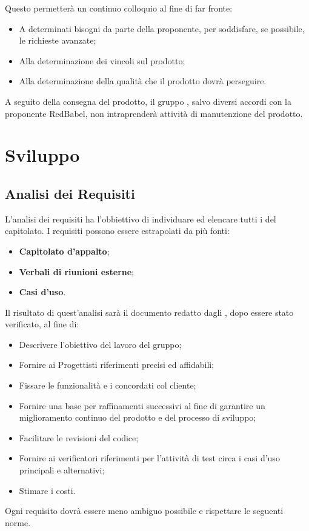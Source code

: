 \documentclass[NormeDiProgetto.tex]{subfiles}
\begin{document}
Questo permetterà un continuo colloquio al fine di far fronte:
\begin{itemize} 
	\item A determinati bisogni da parte della proponente, per soddisfare, se possibile, le richieste avanzate;
	\item Alla determinazione dei vincoli sul prodotto;
	\item Alla determinazione della qualità che il prodotto dovrà perseguire.
\end{itemize}
A seguito della consegna del prodotto, il gruppo \gruppo, salvo diversi accordi con la proponente RedBabel, non intraprenderà attività di manutenzione del prodotto. 

\section{Sviluppo}
\subsection{Analisi dei Requisiti}
L'analisi dei requisiti ha l'obbiettivo di individuare ed elencare tutti i  del capitolato. I requisiti possono essere estrapolati da più fonti:
\begin{itemize}
	\item \textbf{Capitolato d'appalto};
	\item \textbf{Verbali di riunioni esterne};
	\item \textbf{Casi d'uso}.
\end{itemize}
Il risultato di quest'analisi sarà il documento \adr \vrquattro redatto dagli \alisti, dopo essere stato verificato, al fine di:
\begin{itemize}
\item Descrivere l'obiettivo del lavoro del gruppo;
\item Fornire ai Progettisti riferimenti precisi ed affidabili;
\item Fissare le funzionalità e i  concordati col cliente;
\item Fornire una base per raffinamenti successivi al fine di garantire un
miglioramento continuo del prodotto e del processo di sviluppo;
\item Facilitare le revisioni del codice;
\item Fornire ai verificatori riferimenti per l'attività di test circa i casi d'uso principali e alternativi;
\item Stimare i costi.
\end{itemize}
Ogni requisito dovrà essere meno ambiguo possibile e rispettare le seguenti norme.
\end{document}
